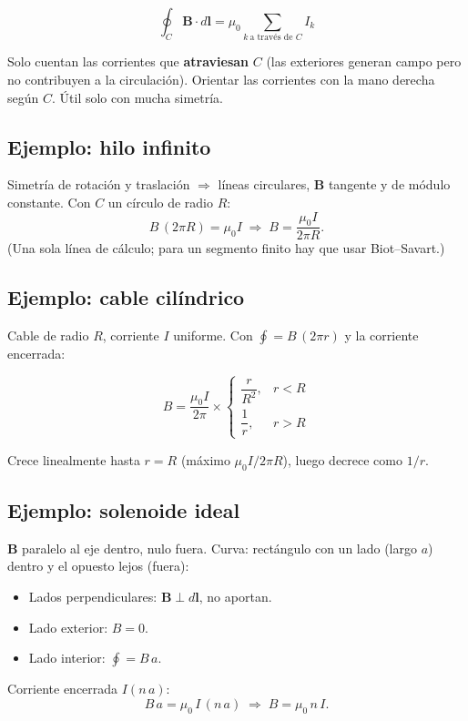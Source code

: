 \documentclass[12pt,a4paper]{article}
\begin{document}
\begin{keybox}
  \[
  \boxed{\oint_C \mathbf{B}\cdot d\mathbf{l} = \mu_0
         \sum_{k\ \text{a través de } C} I_k}
  \]
\end{keybox}

\begin{notebox}
  Solo cuentan las corrientes que \textbf{atraviesan} $C$ (las exteriores
  generan campo pero no contribuyen a la circulación). Orientar las
  corrientes con la mano derecha según $C$. Útil solo con mucha simetría.
\end{notebox}

\subsection{Ejemplo: hilo infinito}

Simetría de rotación y traslación $\Rightarrow$ líneas circulares,
$\mathbf{B}$ tangente y de módulo constante. Con $C$ un círculo de radio
$R$:
\[
B\,(2\pi R) = \mu_0 I \;\Longrightarrow\; \boxed{B = \frac{\mu_0 I}{2\pi R}}.
\]
(Una sola línea de cálculo; para un segmento finito hay que usar
Biot--Savart.)



\subsection{Ejemplo: cable cilíndrico}

Cable de radio $R$, corriente $I$ uniforme. Con $\oint = B\,(2\pi r)$ y
la corriente encerrada:

\begin{keybox}
  \[
  \boxed{B = \frac{\mu_0 I}{2\pi}\times
  \begin{cases}
  \dfrac{r}{R^2}, & r < R \\[2mm]
  \dfrac{1}{r}, & r > R
  \end{cases}}
  \]
\end{keybox}

Crece linealmente hasta $r=R$ (máximo $\mu_0 I/2\pi R$), luego decrece
como $1/r$.



\subsection{Ejemplo: solenoide ideal}

$\mathbf{B}$ paralelo al eje dentro, nulo fuera. Curva: rectángulo con un
lado (largo $a$) dentro y el opuesto lejos (fuera):
\begin{itemize}[nosep]
  \item Lados perpendiculares: $\mathbf{B}\perp d\mathbf{l}$, no aportan.
  \item Lado exterior: $B=0$.
  \item Lado interior: $\oint = B\,a$.
\end{itemize}
Corriente encerrada $I(n\,a)$:
\[
B\,a = \mu_0\, I\,(n\,a) \;\Longrightarrow\; \boxed{B = \mu_0\, n\, I}.
\]
\end{document}
